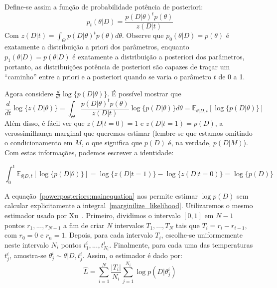 \documentclass[12pt]{article}
\newcommand{\expectation}{\mathbb{E}}
\begin{document}
Define-se assim a função de probabilidade potência de posteriori:
\begin{equation}
    p_t (\theta | D) = \frac{p (D | \theta) ^ t p (\theta)}{z(D | t)}
\end{equation}
Com $z(D | t) = \int_{\Theta} p(D | \theta) ^ t p(\theta)d\theta$.
Observe que $p_0 (\theta | D) = p(\theta)$ é exatamente a distribuição 
a priori dos parâmetros, enquanto $p_1 (\theta | D) = p(\theta | D)$ é
exatamente a distribuição a posteriori dos parâmetros, portanto, as 
distribuições potência de posteriori são capazes de traçar um ``caminho''
entre a priori e a posteriori quando se varia o parâmetro $t$ de 0 a 1.

Agora considere $\frac{d}{dt} \log\{p (D|\theta)\}$. É possível mostrar
que 
\begin{equation}
\frac{d}{dt}\log \{z (D | \theta)\} = 
\int_{\Theta}\frac{p(D|\theta)^tp(\theta)}{z(D|t)}\log\{p(D|\theta)\}d\theta
=\expectation_{\theta | D, t}[\log\{p (D|\theta)\}]
\end{equation}
Além disso, é fácil ver que $z(D| t = 0) = 1$ e $z (D| t = 1) = 
p(D)$, a verossimilhança marginal que queremos estimar (lembre-se que 
estamos omitindo o condicionamento em $M$, o que significa que $p(D)$ é, 
na verdade, $p (D | M)$). Com estas informações, podemos escrever a 
identidade:

\begin{equation}\label{powerposteriors:mainequation}
    \int_0^1\expectation_{\theta | D, t}[\log\{p(D | \theta)\}] = 
        \log\{z(D | t = 1)\} - \log\{z (D | t = 0)\} = \log \{p (D)\} 
\end{equation}

A equação~\ref{powerposteriors:mainequation} nos permite estimar 
$\log {p (D)}$ sem calcular explicitamente a 
integral~\ref{marginilize_likelihood}. Utilizaremos o mesmo estimador 
usado por Xu~\cite{Xu2010}. Primeiro, dividimos o intervalo $[0, 1]$ em 
$N - 1$ pontos $r_1, ..., r_{N - 1}$ a fim de criar $N$ intervalos
$T_1, ..., T_N$ tais que $T_i = r_i - r_{i - 1}$, com $r_0 = 0$ e 
$r_n = 1$. Depois, para cada intervalo $T_i$, escolhe-se uniformemente
neste intervalo $N_i$ pontos $t^i_{1}, ..., t^i_{N_i}$. Finalmente, para 
cada uma das temperaturas $t^i_j$, amostra-se $\theta^i_j \sim \theta | D, t^i_j$.
Assim, o estimador é dado por:
\begin{equation}\label{estimador:marginallikelihood}
    \hat{L} = \sum_{i = 1}^N \frac{|T_i|}{N_i} \sum_{j = 1}^{N_i} \log {p (D | \theta^i_j)}
\end{equation}
\end{document}
